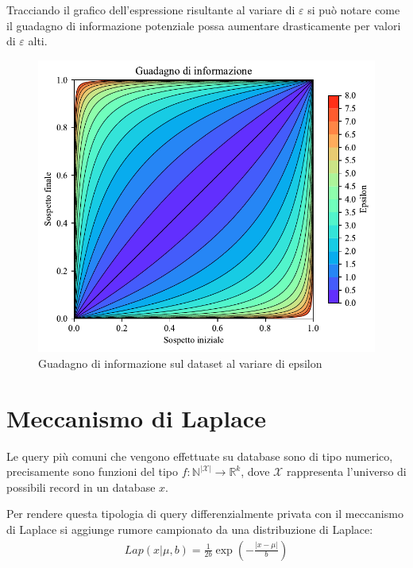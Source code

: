 Tracciando il grafico dell'espressione risultante al variare di $\varepsilon$ si può notare come il guadagno di informazione potenziale possa aumentare drasticamente per valori di $\varepsilon$ alti.
\begin{figure}[H]
    \centering
    \includegraphics[scale=0.8]{plots/information_gain.pdf}
    \caption{Guadagno di informazione sul dataset al variare di epsilon}
\end{figure}

\section{Meccanismo di Laplace}
Le query più comuni che vengono effettuate su database sono di tipo numerico, precisamente sono funzioni del tipo $f \colon \mathbb{N}^{|\mathcal{X}|} \to \mathbb{R}^k$, dove $\mathcal{X}$ rappresenta l'universo di possibili record in un database $x$.

Per rendere questa tipologia di query differenzialmente privata con il meccanismo di Laplace si aggiunge rumore campionato da una distribuzione di Laplace:
\begin{align}
\label{eq:laplace_distribution}
    Lap(x|\mu,b) = \frac{1}{2b}\exp\left({-\frac{|x-\mu|}{b}}\right)
\end{align}

